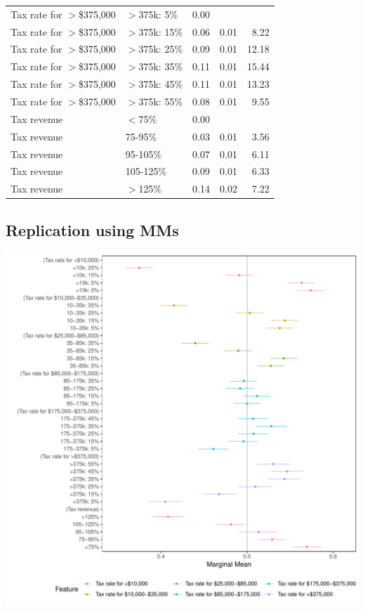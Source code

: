 \documentclass[a4paper,12pt]{article}\usepackage[]{graphicx}\usepackage[]{color}
\makeatletter
\def\maxwidth{ %
  \ifdim\Gin@nat@width>\linewidth
    \linewidth
  \else
    \Gin@nat@width
  \fi
}
\newenvironment{knitrout}{}{} %
\makeatother
\begin{document}
\begin{table}[ht]
\begin{tabular}{lp{1.5in}rrr}
  Tax rate for $>$\$375,000 & $>$375k: 5\% & 0.00 &  &  \\ 
  Tax rate for $>$\$375,000 & $>$375k: 15\% & 0.06 & 0.01 & 8.22 \\ 
  Tax rate for $>$\$375,000 & $>$375k: 25\% & 0.09 & 0.01 & 12.18 \\ 
  Tax rate for $>$\$375,000 & $>$375k: 35\% & 0.11 & 0.01 & 15.44 \\ 
  Tax rate for $>$\$375,000 & $>$375k: 45\% & 0.11 & 0.01 & 13.23 \\ 
  Tax rate for $>$\$375,000 & $>$375k: 55\% & 0.08 & 0.01 & 9.55 \\ 
  Tax revenue & $<$75\% & 0.00 &  &  \\ 
  Tax revenue & 75-95\% & 0.03 & 0.01 & 3.56 \\ 
  Tax revenue & 95-105\% & 0.07 & 0.01 & 6.11 \\ 
  Tax revenue & 105-125\% & 0.09 & 0.01 & 6.33 \\ 
  Tax revenue & $>$125\% & 0.14 & 0.02 & 7.22 \\ 
   \hline
\end{tabular}
\end{table}


\clearpage

\subsection{Replication using MMs}

\begin{knitrout}
\color{fgcolor}
\includegraphics[width=\maxwidth]{figure/bms_mm_appendix-1} 

\end{knitrout}
\end{document}
